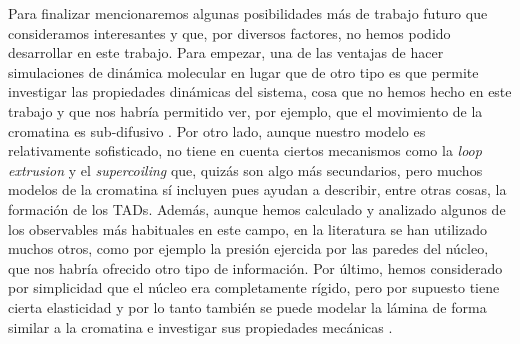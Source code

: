 Para finalizar mencionaremos algunas posibilidades más de trabajo futuro que consideramos interesantes y que, por diversos factores, no hemos podido desarrollar en este trabajo. Para empezar, una de las ventajas de hacer simulaciones de dinámica molecular en lugar que de otro tipo es que permite investigar las propiedades dinámicas del sistema, cosa que no hemos hecho en este trabajo y que nos habría permitido ver, por ejemplo, que el movimiento de la cromatina es sub-difusivo \cite{Shi2018}. Por otro lado, aunque nuestro modelo es relativamente sofisticado, no tiene en cuenta ciertos mecanismos como la \textit{loop extrusion} y el \textit{supercoiling} que, quizás son algo más secundarios, pero muchos modelos de la cromatina sí incluyen pues ayudan a describir, entre otras cosas, la formación de los TADs. Además, aunque hemos calculado y analizado algunos de los observables más habituales en este campo, en la literatura se han utilizado muchos otros, como por ejemplo la presión ejercida por las paredes del núcleo, que nos habría ofrecido otro tipo de información. Por último, hemos considerado por simplicidad que el núcleo era completamente rígido, pero por supuesto tiene cierta elasticidad y por lo tanto también se puede modelar la lámina de forma similar a la cromatina e investigar sus propiedades mecánicas \cite{Attar2024}.
